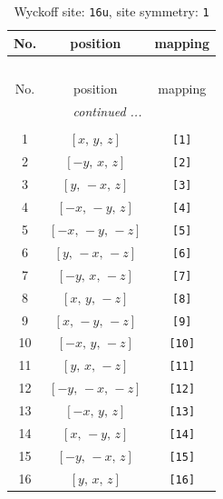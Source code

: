 \documentclass[fleqn,8pt]{jsarticle}
\begin{document}
\begin{longtable}{ccc}
\caption{Wyckoff site: {\tt 16u}, site symmetry: {\tt 1}}
 \\
 \hline \hline
No. & position & mapping \\ \hline \endfirsthead

\multicolumn{2}{l}{\tablename\ \thetable{}} \\
 \hline \hline
No. & position & mapping \\ \hline \endhead

 \hline \hline
\multicolumn{2}{r}{\footnotesize\it continued ...} \\ \endfoot

 \hline \hline
\multicolumn{2}{r}{} \\ \endlastfoot

1 & $\left[ x,\, y,\, z \right]$ & {\tt [1]} \\ \hline
2 & $\left[ - y,\, x,\, z \right]$ & {\tt [2]} \\ \hline
3 & $\left[ y,\, - x,\, z \right]$ & {\tt [3]} \\ \hline
4 & $\left[ - x,\, - y,\, z \right]$ & {\tt [4]} \\ \hline
5 & $\left[ - x,\, - y,\, - z \right]$ & {\tt [5]} \\ \hline
6 & $\left[ y,\, - x,\, - z \right]$ & {\tt [6]} \\ \hline
7 & $\left[ - y,\, x,\, - z \right]$ & {\tt [7]} \\ \hline
8 & $\left[ x,\, y,\, - z \right]$ & {\tt [8]} \\ \hline
9 & $\left[ x,\, - y,\, - z \right]$ & {\tt [9]} \\ \hline
10 & $\left[ - x,\, y,\, - z \right]$ & {\tt [10]} \\ \hline
11 & $\left[ y,\, x,\, - z \right]$ & {\tt [11]} \\ \hline
12 & $\left[ - y,\, - x,\, - z \right]$ & {\tt [12]} \\ \hline
13 & $\left[ - x,\, y,\, z \right]$ & {\tt [13]} \\ \hline
14 & $\left[ x,\, - y,\, z \right]$ & {\tt [14]} \\ \hline
15 & $\left[ - y,\, - x,\, z \right]$ & {\tt [15]} \\ \hline
16 & $\left[ y,\, x,\, z \right]$ & {\tt [16]} \\
\end{longtable}
\end{document}
